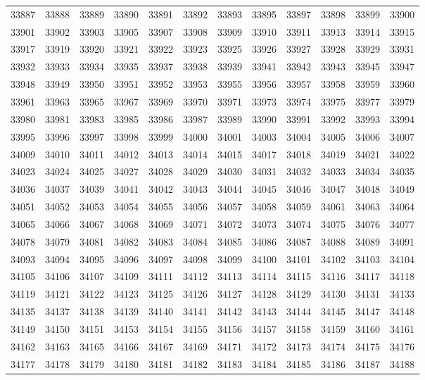 \begin{center}
\begin{longtable}{llllllllllll}
33887 &33888 &33889 &33890 &33891 &33892 &33893 &33895 &33897 &33898 &33899 &33900 \\
33901 &33902 &33903 &33905 &33907 &33908 &33909 &33910 &33911 &33913 &33914 &33915 \\
33917 &33919 &33920 &33921 &33922 &33923 &33925 &33926 &33927 &33928 &33929 &33931 \\
33932 &33933 &33934 &33935 &33937 &33938 &33939 &33941 &33942 &33943 &33945 &33947 \\
33948 &33949 &33950 &33951 &33952 &33953 &33955 &33956 &33957 &33958 &33959 &33960 \\
33961 &33963 &33965 &33967 &33969 &33970 &33971 &33973 &33974 &33975 &33977 &33979 \\
33980 &33981 &33983 &33985 &33986 &33987 &33989 &33990 &33991 &33992 &33993 &33994 \\
33995 &33996 &33997 &33998 &33999 &34000 &34001 &34003 &34004 &34005 &34006 &34007 \\
34009 &34010 &34011 &34012 &34013 &34014 &34015 &34017 &34018 &34019 &34021 &34022 \\
34023 &34024 &34025 &34027 &34028 &34029 &34030 &34031 &34032 &34033 &34034 &34035 \\
34036 &34037 &34039 &34041 &34042 &34043 &34044 &34045 &34046 &34047 &34048 &34049 \\
34051 &34052 &34053 &34054 &34055 &34056 &34057 &34058 &34059 &34061 &34063 &34064 \\
34065 &34066 &34067 &34068 &34069 &34071 &34072 &34073 &34074 &34075 &34076 &34077 \\
34078 &34079 &34081 &34082 &34083 &34084 &34085 &34086 &34087 &34088 &34089 &34091 \\
34093 &34094 &34095 &34096 &34097 &34098 &34099 &34100 &34101 &34102 &34103 &34104 \\
34105 &34106 &34107 &34109 &34111 &34112 &34113 &34114 &34115 &34116 &34117 &34118 \\
34119 &34121 &34122 &34123 &34125 &34126 &34127 &34128 &34129 &34130 &34131 &34133 \\
34135 &34137 &34138 &34139 &34140 &34141 &34142 &34143 &34144 &34145 &34147 &34148 \\
34149 &34150 &34151 &34153 &34154 &34155 &34156 &34157 &34158 &34159 &34160 &34161 \\
34162 &34163 &34165 &34166 &34167 &34169 &34171 &34172 &34173 &34174 &34175 &34176 \\
34177 &34178 &34179 &34180 &34181 &34182 &34183 &34184 &34185 &34186 &34187 &34188 \\

\end{longtable}
\end{center}
